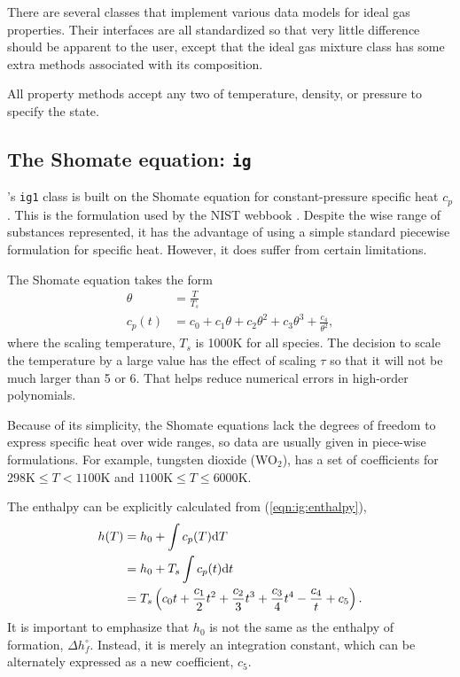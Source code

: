 There are several classes that implement various data models for ideal gas properties.  Their interfaces are all standardized so that very little difference should be apparent to the user, except that the ideal gas mixture class has some extra methods associated with its composition.

All property methods accept any two of temperature, density, or pressure to specify the state.

\subsection{The Shomate equation: \texttt{ig}}

\PM's \texttt{ig1} class is built on the Shomate equation for constant-pressure specific heat $c_p$.  This is the formulation used by the NIST webbook \cite{nist:webbook}.  Despite the wise range of substances represented, it has the advantage of using a simple standard piecewise formulation for specific heat.  However, it does suffer from certain limitations.

The Shomate equation takes the form
\begin{align}
\theta &= \frac{T}{T_s}\\
c_p(t) &= c_0 + c_1 \theta + c_2 \theta^2 + c_3 \theta^3 + \frac{c_4}{\theta^2},
\end{align}
where the scaling temperature, $T_s$ is 1000K for all species.  The decision to scale the temperature by a large value has the effect of scaling $\tau$ so that it will not be much larger than 5 or 6.  That helps reduce numerical errors in high-order polynomials.

Because of its simplicity, the Shomate equations lack the degrees of freedom to express specific heat over wide ranges, so data are usually given in piece-wise formulations.  For example, tungsten dioxide (WO$_2$), has a set of coefficients for $298\mathrm{K} \le T < 1100\mathrm{K}$ and $1100\mathrm{K} \le T \le 6000\mathrm{K}$.

The enthalpy can be explicitly calculated from (\ref{eqn:ig:enthalpy}),
\begin{align}
h(T) &= h_0 + \int c_p(T) \mathrm{d} T \nonumber\\
 &= h_0 + T_s \int c_p(t) \mathrm{d} t \nonumber\\
 &= T_s \left(c_0 t + \frac{c_1}{2} t^2 + \frac{c_2}{3} t^3 + \frac{c_3}{4} t^4 - \frac{c_4}{t} + c_5 \right).
\end{align}
It is important to emphasize that $h_0$ is not the same as the enthalpy of formation, $\Delta h^\circ_f$.  Instead, it is merely an integration constant, which can be alternately expressed as a new coefficient, $c_5$.

